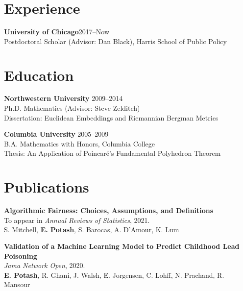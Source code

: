\documentclass[margin,line]{resume}
\begin{document}
\address{epotash@uchicago.edu / \href{http://www.k2co3.net}{k2co3.net} / \href{https://github.com/potash}{github.com/potash}}
\begin{resume}
\section{\mysidestyle Experience}
	{\bf University of Chicago}\hfill{2017--Now}\\
	Postdoctoral Scholar (Advisor: Dan Black), Harris School of Public Policy

    \section{\mysidestyle Education}
	
	{\bf Northwestern University} \hfill {2009--2014} \\%
	Ph.D. Mathematics (Advisor: Steve Zelditch) \\
	Dissertation: Euclidean Embeddings and Riemannian Bergman Metrics

	{\bf Columbia University} \hfill {2005--2009} \\%
    B.A. Mathematics with Honors, Columbia College \\
	Thesis: An Application of Poincar\'e's Fundamental Polyhedron Theorem

	
	\section{\mysidestyle Publications}
        {\bf Algorithmic Fairness: Choices, Assumptions, and Definitions}\\
        To appear in \textit{Annual Reviews of Statistics}, 2021.\\
        S. Mitchell, \textbf{E. Potash}, S. Barocas, A. D'Amour, K. Lum

        {\bf Validation of a Machine Learning Model to Predict Childhood Lead \\ Poisoning}\\
        \textit{Jama Network Open}, 2020.\\
        \textbf{E. Potash}, R. Ghani, J. Walsh, E. Jorgensen, C. Lohff, N. Prachand, R. Mansour


\end{resume}
\end{document}
